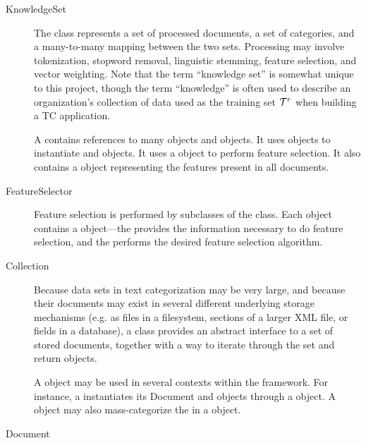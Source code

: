 \begin{description}

\item[KnowledgeSet]

The  class represents a set of processed documents, a set
of categories, and a many-to-many mapping between the two sets.
Processing may involve tokenization, stopword removal, linguistic
stemming, feature selection, and vector weighting.  Note that the term
``knowledge set'' is somewhat unique to this project, though the term
``knowledge'' is often used to describe an organization's collection
of data used as the training set $\mathcal{T}^r$ when building a TC
application.

A  contains references to many  objects and
 objects.  It uses  objects to instantiate 
and  objects.  It uses a  object to perform
feature selection.  It also contains a  object
representing the features present in all documents.

\item[FeatureSelector]

Feature selection is performed by subclasses of the 
class.  Each  object contains a 
object---the  provides the information necessary to do
feature selection, and the  performs the desired
feature selection algorithm.

\item[Collection]

Because data sets in text categorization may be very large, and
because their documents may exist in several different underlying
storage mechanisms (e.g. as files in a filesystem, sections of a
larger XML file, or fields in a database), a  class provides
an abstract interface to a set of stored documents, together with a
way to iterate through the set and return  objects.

A  object may be used in several contexts within the
framework.  For instance, a  instantiates its Document and
 objects through a  object.  A  object may
also mass-categorize the  in a  object.

\item[Document]


\end{description}
